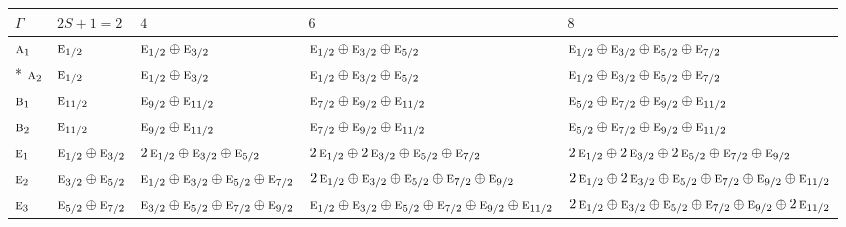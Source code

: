 \documentclass[10pt,a4paper]{article}
\numberwithin{equation}{section}
\newcommand{\irr}[1]{\text{\normalfont\scshape #1}}
\begin{document}
{\small\setlength{\tabcolsep}{3pt}\begin{longtable}{@{}l>{\RaggedRight\arraybackslash}p{}>{\RaggedRight\arraybackslash}p{}>{\RaggedRight\arraybackslash}p{}>{\RaggedRight\arraybackslash}p{}@{}}\toprule
$\Gamma$ & $2S + 1 = 2$ & $4$ & $6$ & $8$\\\midrule\endhead
\bottomrule\endfoot\endlastfoot
$\irr{a}_{1}$ & $\irr{e}_{1/2}$ & $\irr{e}_{1/2}\oplus \irr{e}_{3/2}$ & $\irr{e}_{1/2}\oplus \irr{e}_{3/2}\oplus \irr{e}_{5/2}$ & $\irr{e}_{1/2}\oplus \irr{e}_{3/2}\oplus \irr{e}_{5/2}\oplus \irr{e}_{7/2}$\\*
$\irr{a}_{2}$ & $\irr{e}_{1/2}$ & $\irr{e}_{1/2}\oplus \irr{e}_{3/2}$ & $\irr{e}_{1/2}\oplus \irr{e}_{3/2}\oplus \irr{e}_{5/2}$ & $\irr{e}_{1/2}\oplus \irr{e}_{3/2}\oplus \irr{e}_{5/2}\oplus \irr{e}_{7/2}$\\
$\irr{b}_{1}$ & $\irr{e}_{11/2}$ & $\irr{e}_{9/2}\oplus \irr{e}_{11/2}$ & $\irr{e}_{7/2}\oplus \irr{e}_{9/2}\oplus \irr{e}_{11/2}$ & $\irr{e}_{5/2}\oplus \irr{e}_{7/2}\oplus \irr{e}_{9/2}\oplus \irr{e}_{11/2}$\\
$\irr{b}_{2}$ & $\irr{e}_{11/2}$ & $\irr{e}_{9/2}\oplus \irr{e}_{11/2}$ & $\irr{e}_{7/2}\oplus \irr{e}_{9/2}\oplus \irr{e}_{11/2}$ & $\irr{e}_{5/2}\oplus \irr{e}_{7/2}\oplus \irr{e}_{9/2}\oplus \irr{e}_{11/2}$\\
$\irr{e}_{1}$ & $\irr{e}_{1/2}\oplus \irr{e}_{3/2}$ & $2\,\irr{e}_{1/2}\oplus \irr{e}_{3/2}\oplus \irr{e}_{5/2}$ & $2\,\irr{e}_{1/2}\oplus 2\,\irr{e}_{3/2}\oplus \irr{e}_{5/2}\oplus \irr{e}_{7/2}$ & $2\,\irr{e}_{1/2}\oplus 2\,\irr{e}_{3/2}\oplus 2\,\irr{e}_{5/2}\oplus \irr{e}_{7/2}\oplus \irr{e}_{9/2}$\\
$\irr{e}_{2}$ & $\irr{e}_{3/2}\oplus \irr{e}_{5/2}$ & $\irr{e}_{1/2}\oplus \irr{e}_{3/2}\oplus \irr{e}_{5/2}\oplus \irr{e}_{7/2}$ & $2\,\irr{e}_{1/2}\oplus \irr{e}_{3/2}\oplus \irr{e}_{5/2}\oplus \irr{e}_{7/2}\oplus \irr{e}_{9/2}$ & $2\,\irr{e}_{1/2}\oplus 2\,\irr{e}_{3/2}\oplus \irr{e}_{5/2}\oplus \irr{e}_{7/2}\oplus \irr{e}_{9/2}\oplus \irr{e}_{11/2}$\\
$\irr{e}_{3}$ & $\irr{e}_{5/2}\oplus \irr{e}_{7/2}$ & $\irr{e}_{3/2}\oplus \irr{e}_{5/2}\oplus \irr{e}_{7/2}\oplus \irr{e}_{9/2}$ & $\irr{e}_{1/2}\oplus \irr{e}_{3/2}\oplus \irr{e}_{5/2}\oplus \irr{e}_{7/2}\oplus \irr{e}_{9/2}\oplus \irr{e}_{11/2}$ & $2\,\irr{e}_{1/2}\oplus \irr{e}_{3/2}\oplus \irr{e}_{5/2}\oplus \irr{e}_{7/2}\oplus \irr{e}_{9/2}\oplus 2\,\irr{e}_{11/2}$\\

\end{longtable}}
\end{document}
